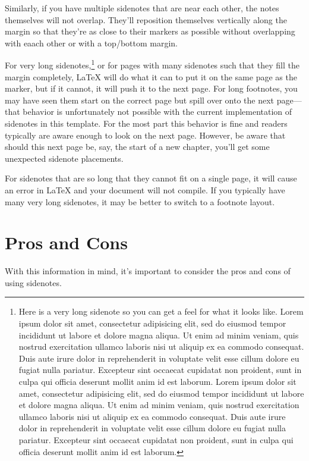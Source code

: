 \documentclass[./dissertation.tex]{subfiles}
\begin{document}
    Similarly, if you have multiple sidenotes that are near each other, the notes themselves will not overlap. They'll reposition themselves vertically along the margin so that they're as close to their markers as possible without overlapping with eaach other or with a top/bottom margin.

    For very long sidenotes,\footnote{Here is a very long sidenote so you can get a feel for what it looks like. Lorem ipsum dolor sit amet, consectetur adipisicing elit, sed do eiusmod tempor incididunt ut labore et dolore magna aliqua. Ut enim ad minim veniam, quis nostrud exercitation ullamco laboris nisi ut aliquip ex ea commodo consequat. Duis aute irure dolor in reprehenderit in voluptate velit esse cillum dolore eu fugiat nulla pariatur. Excepteur sint occaecat cupidatat non proident, sunt in culpa qui officia deserunt mollit anim id est laborum. Lorem ipsum dolor sit amet, consectetur adipisicing elit, sed do eiusmod tempor incididunt ut labore et dolore magna aliqua. Ut enim ad minim veniam, quis nostrud exercitation ullamco laboris nisi ut aliquip ex ea commodo consequat. Duis aute irure dolor in reprehenderit in voluptate velit esse cillum dolore eu fugiat nulla pariatur. Excepteur sint occaecat cupidatat non proident, sunt in culpa qui officia deserunt mollit anim id est laborum.} or for pages with many sidenotes such that they fill the margin completely, {\LaTeX} will do what it can to put it on the same page as the marker, but if it cannot, it will push it to the next page. For long footnotes, you may have seen them start on the correct page but spill over onto the next page---that behavior is unfortunately not possible with the current implementation of sidenotes in this template. For the most part this behavior is fine and readers typically are aware enough to look on the next page. However, be aware that should this next page be, say, the start of a new chapter, you'll get some unexpected sidenote placements.

    For sidenotes that are so long that they cannot fit on a single page, it will cause an error in {\LaTeX} and your document will not compile. If you typically have many very long sidenotes, it may be better to switch to a footnote layout.



    \section{Pros and Cons}

    With this information in mind, it's important to consider the pros and cons of using sidenotes.
\end{document}
